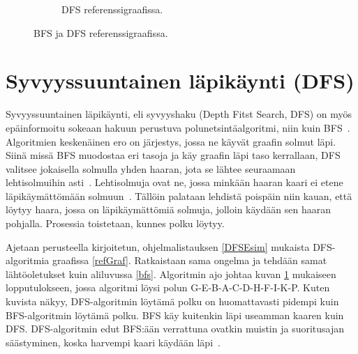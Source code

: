 \begin{figure}
\begin{subfigure}[b]{0.3\textwidth}
		\caption{DFS referenssigraafissa.}\label{refDFS}
	\end{subfigure}
	\caption{BFS ja DFS referenssigraafissa.}\label{refPlusBasics}
\end{figure}

\section{Syvyyssuuntainen läpikäynti (DFS)}\label{dfs}
Syvyyssuuntainen läpikäynti, eli syvyyshaku (Depth Fitst Search, DFS) on 
myös epäinformoitu sokeaan hakuun perustuva polunetsintäalgoritmi, niin kuin 
BFS~\cite{applSciLawande}. Algoritmien keskenäinen ero on  järjestys, jossa ne 
käyvät graafin solmut läpi. Siinä missä BFS muodostaa eri tasoja ja käy 
graafin läpi taso kerrallaan, DFS valitsee jokaisella solmulla yhden haaran, 
jota se lähtee seuraamaan lehtisolmuihin asti~\cite{DFSMapColoring}. 
Lehtisolmuja ovat ne, jossa minkään haaran kaari ei etene läpikäymättömään 
solmuun~\cite{DFSMapColoring}. Tällöin palataan lehdistä poispäin niin kauan, 
että löytyy haara, jossa on läpikäymättömiä solmuja, jolloin käydään sen 
haaran pohjalla. Prosessia toistetaan, kunnes polku löytyy. \par
	Ajetaan \textcite{DFSMapColoring} perusteella kirjoitetun, 
ohjelmalistauksen \ref{DFSEsim} mukaista DFS-algoritmia graafissa 
\ref{refGraf}. Ratkaistaan sama ongelma ja tehdään samat lähtöoletukset kuin 
aliluvussa \ref{bfs}. Algoritmin ajo johtaa kuvan \ref{refDFS} mukaiseen 
lopputulokseen, jossa algoritmi löysi polun G-E-B-A-C-D-H-F-I-K-P. 
Kuten kuvista näkyy, DFS-algoritmin löytämä polku on huomattavasti pidempi 
kuin BFS-algoritmin löytämä polku. BFS käy kuitenkin läpi useamman kaaren 
kuin DFS. DFS-algoritmin edut BFS:ään verrattuna ovatkin muistin ja 
suoritusajan säästyminen, koska harvempi kaari käydään 
läpi~\cite{applSciLawande}.

